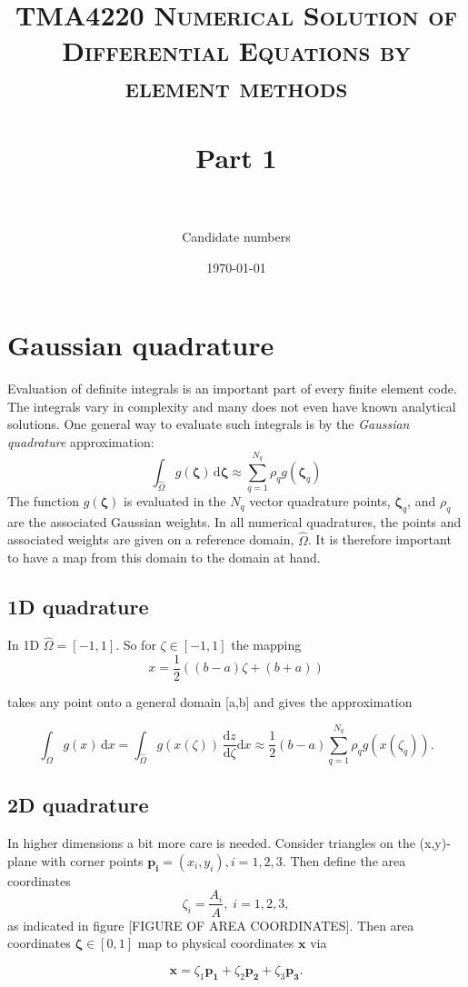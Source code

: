 \documentclass[paper=a4, fontsize=11pt]{scrartcl} %
\title{	
\normalfont \normalsize 
\textsc{TMA4220 Numerical Solution of Differential Equations by element methods} \\ [25pt] %
\horrule{0.5pt} \\[0.4cm] %
\huge Part 1 \\ %
\horrule{2pt} \\[0.5cm] %
}
\author{Candidate numbers} %
\date{\normalsize\today} %
\begin{document}
\maketitle

\section{Gaussian quadrature}
Evaluation of definite integrals is an important part of every finite element code. The integrals vary in complexity and many does not even have known analytical solutions. One general way to evaluate such integrals is by the \textit{Gaussian quadrature} approximation:
\[ \int_{\hat{\Omega}} \! g(\mathbf{\zeta}) \, \mathrm{d}\mathbf{\zeta} \approx \sum_{q=1}^{N_q} \rho_{q}g(\mathbf{\zeta}_q)
\]
The function $g(\mathbf{\zeta})$ is evaluated in the $N_q$ vector quadrature points, $\mathbf{\zeta}_q$, and $\rho_q$ are the associated Gaussian weights. In all numerical quadratures, the points and associated weights are given on a reference domain, $\hat{\Omega}$. It is therefore important to have a map from this domain to the domain at hand.

\subsection{1D quadrature}

In 1D $\hat{\Omega}=[-1,1]$. So for $\zeta \in [-1,1]$ the mapping
\[ x=\frac{1}{2} \left((b-a) \zeta +(b+a)\right)
\]

takes any point onto a general domain [a,b] and gives the approximation

\[ \int_{\Omega} \! g(x) \, \mathrm{d}x = \int_{\hat{\Omega}} \! g\left(x(\zeta)\right) \, \frac{\mathrm{d}z}{\mathrm{d}\zeta}\mathrm{d}x \approx \frac{1}{2}(b-a) \sum_{q=1}^{N_q} \rho_{q}g(x(\zeta_q)).
\]

\subsection{2D quadrature}
In higher dimensions a bit more care is needed. Consider triangles on the (x,y)-plane with corner points $\mathbf{p_i}=(x_i,y_i), i=1,2,3$. Then define the area coordinates 
\[ \zeta_i = \frac{A_i}{A}, \; i=1,2,3,\]
as indicated in figure [FIGURE OF AREA COORDINATES]. Then area coordinates $\mathbf{\zeta} \in [0,1]$ map to physical coordinates $\mathbf{x}$ via

\[ \mathbf{x} = \zeta_1\mathbf{p_1} +\zeta_2\mathbf{p_2} +\zeta_3\mathbf{p_3}.
\]
\end{document}
